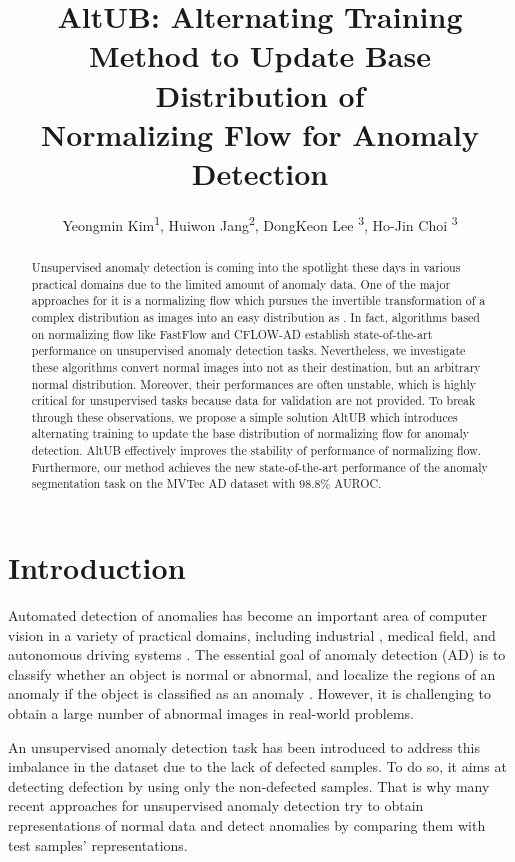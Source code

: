 \documentclass[letterpaper]{article}
\title{AltUB: Alternating Training Method to Update Base Distribution of \\Normalizing Flow for Anomaly Detection}
\author{
    Yeongmin Kim\equalcontrib \textsuperscript{\rm 1}, 
    Huiwon Jang\equalcontrib \textsuperscript{\rm 2}, 
    DongKeon Lee \textsuperscript{\rm 3}, 
    Ho-Jin Choi \textsuperscript{\rm 3}
}
\begin{document}
\maketitle

\begin{abstract}
Unsupervised anomaly detection is coming into the spotlight these days in various practical domains due to the limited amount of anomaly data. One of the major approaches for it is a normalizing flow which pursues the invertible transformation of a complex distribution as images into an easy distribution as . In fact, algorithms based on normalizing flow like FastFlow and CFLOW-AD establish state-of-the-art performance on unsupervised anomaly detection tasks. Nevertheless, we investigate these algorithms convert normal images into not  as their destination, but an arbitrary normal distribution. Moreover, their performances are often unstable, which is highly critical for unsupervised tasks because data for validation are not provided. To break through these observations, we propose a simple solution AltUB which introduces alternating training to update the base distribution of normalizing flow for anomaly detection. AltUB effectively improves the stability of performance of normalizing flow. Furthermore, our method achieves the new state-of-the-art performance of the anomaly segmentation task on the MVTec AD dataset with 98.8\% AUROC.
\end{abstract}

\section{Introduction}
Automated detection of anomalies has become an important area of computer vision in a variety of practical domains, including industrial \cite{bergmann1}, medical \cite{zhou1} field, and autonomous driving systems \cite{jung1}. The essential goal of anomaly detection (AD) is to classify whether an object is normal or abnormal, and localize the regions of an anomaly if the object is classified as an anomaly \cite{wu1}. However, it is challenging to obtain a large number of abnormal images in real-world problems.

An unsupervised anomaly detection task has been introduced to address this imbalance in the dataset due to the lack of defected samples. To do so, it aims at detecting defection by using only the non-defected samples. That is why many recent approaches for unsupervised anomaly detection try to obtain representations of normal data and detect anomalies by comparing them with test samples' representations.
\end{document}
